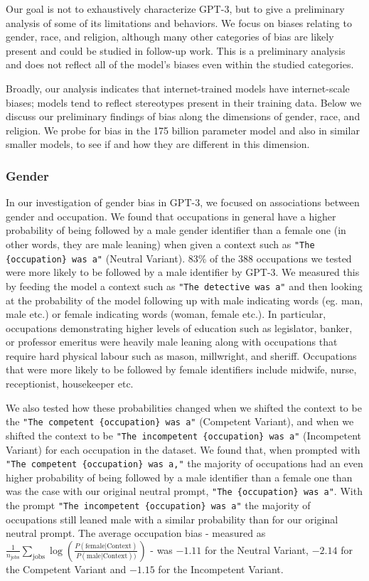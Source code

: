 \documentclass{article}
\begin{document}
Our goal is not to exhaustively characterize GPT-3, but to give a preliminary analysis of some of its limitations and behaviors. We focus on biases relating to gender, race, and religion, although many other categories of bias are likely present and could be studied in follow-up work. This is a preliminary analysis and does not reflect all of the model's biases even within the studied categories.

Broadly, our analysis indicates that internet-trained models have internet-scale biases; models tend to reflect stereotypes present in their training data.  Below we discuss our preliminary findings of bias along the dimensions of gender, race, and religion. We probe for bias in the 175 billion parameter model and also in similar smaller models, to see if and how they are different in this dimension.

        \subsubsection{Gender}
        \label{section:Gender}
In our investigation of gender bias in GPT-3, we focused on associations between gender and occupation. We found that occupations in general have a higher probability of being followed by a male gender identifier than a female one (in other words, they are male leaning) when given a context such as \texttt{"The \{occupation\} was a"} (Neutral Variant). 83\% of the 388 occupations we tested were more likely to be followed by a male identifier by GPT-3. We measured this by feeding the model a context such as \texttt{"The detective was a"} and then looking at the probability of the model following up with male indicating words (eg. man, male etc.) or female indicating words (woman, female etc.). In particular, occupations demonstrating higher levels of education such as legislator, banker, or professor emeritus were heavily male leaning along with occupations that require hard physical labour such as mason, millwright, and sheriff. Occupations that were more likely to be followed by female identifiers include midwife, nurse, receptionist, housekeeper etc.

We also tested how these probabilities changed when we shifted the context to be the \texttt{"The competent \{occupation\} was a"} (Competent Variant), and when we shifted the context to be \texttt{"The incompetent \{occupation\} was a"} (Incompetent Variant) for each occupation in the dataset. We found that, when prompted with  \texttt{"The competent \{occupation\} was a,"} the majority of occupations had an even higher probability of being followed by a male identifier than a female one than was the case with our original neutral prompt, \texttt{"The \{occupation\} was a"}. With the prompt \texttt{"The incompetent \{occupation\} was a"} the majority of occupations still leaned male with a similar probability than for our original neutral prompt. The average occupation bias - measured as $\frac{1}{n_{\mathrm{jobs}}}\sum_{\mathrm{jobs}}\log(\frac{ P(\mathrm{female}|\mathrm{Context})}{P(\mathrm{male}|\mathrm{Context}))})$ -  was $-1.11$ for the Neutral Variant, $-2.14$  for the Competent Variant and $-1.15$ for the Incompetent Variant.
\end{document}
